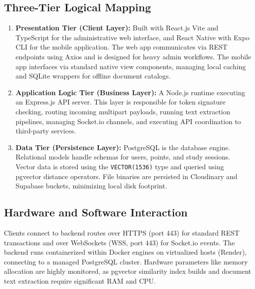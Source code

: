 \documentclass[12,Times new Roman,a4paper]{report}
\begin{document}
\subsection{Three-Tier Logical Mapping}
\begin{enumerate}
    \item \textbf{Presentation Tier (Client Layer):} Built with React.js Vite and TypeScript for the administrative web interface, and React Native with Expo CLI for the mobile application. The web app communicates via REST endpoints using Axios and is designed for heavy admin workflows. The mobile app interfaces via standard native view components, managing local caching and SQLite wrappers for offline document catalogs.
    \item \textbf{Application Logic Tier (Business Layer):} A Node.js runtime executing an Express.js API server. This layer is responsible for token signature checking, routing incoming multipart payloads, running text extraction pipelines, managing Socket.io channels, and executing API coordination to third-party services.
    \item \textbf{Data Tier (Persistence Layer):} PostgreSQL is the database engine. Relational models handle schemas for users, points, and study sessions. Vector data is stored using the \texttt{VECTOR(1536)} type and queried using pgvector distance operators. File binaries are persisted in Cloudinary and Supabase buckets, minimizing local disk footprint.
\end{enumerate}

\subsection{Hardware and Software Interaction}
Clients connect to backend routes over HTTPS (port 443) for standard REST transactions and over WebSockets (WSS, port 443) for Socket.io events. The backend runs containerized within Docker engines on virtualized hosts (Render), connecting to a managed PostgreSQL cluster. Hardware parameters like memory allocation are highly monitored, as pgvector similarity index builds and document text extraction require significant RAM and CPU.
\end{document}
